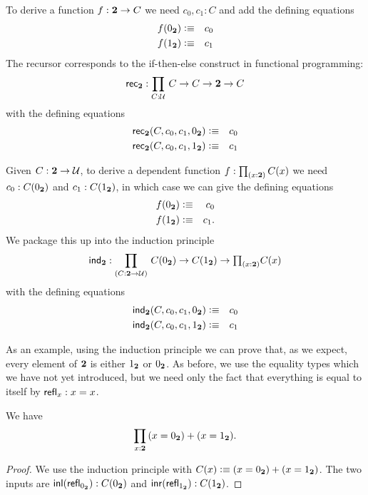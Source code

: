 To derive a function $f : \mathbf{2} \to C$ we need $c_0,c_1 : C$ and
add the defining equations
\begin{eqnarray*}
  f({0_{\mathbf{2}}}) & \vcentcolon\equiv & c_0 \\
  f({1_{\mathbf{2}}}) & \vcentcolon\equiv & c_1
\end{eqnarray*}
The recursor corresponds to the if-then-else construct in
functional programming:
%
\[ \rec{\bool} : \prd{C:\UU}  C \to C \to \bool \to C \]
with the defining equations
\begin{eqnarray*}
  \mathsf{rec}_{\mathbf{2}}(C,c_0,c_1,{0_{\mathbf{2}}}) & \vcentcolon\equiv & c_0 \\
  \mathsf{rec}_{\mathbf{2}}(C,c_0,c_1,{1_{\mathbf{2}}}) & \vcentcolon\equiv & c_1
\end{eqnarray*}

Given $C : \mathbf{2} \to \mathcal{U}$, to derive a dependent function 
$f : \prd{x:\bool}C(x)$ we need $c_0:C({0_{\mathbf{2}}})$ and $c_1 : C({1_{\mathbf{2}}})$, in which case we can give the defining equations
\begin{eqnarray*}
  f({0_{\mathbf{2}}}) & \vcentcolon\equiv & c_0 \\
  f({1_{\mathbf{2}}}) & \vcentcolon\equiv & c_1.
\end{eqnarray*}
We package this up into the induction principle
%
\[ \ind{\bool} : \dprd{C:\bool \to \UU}  C(\bfalse) \to C(\btrue)
\to \tprd{x:\bool} C(x) \]
with the defining equations
\begin{eqnarray*}
  \mathsf{ind}_{\mathbf{2}}(C,c_0,c_1,{0_{\mathbf{2}}}) & \vcentcolon\equiv & c_0 \\
  \mathsf{ind}_{\mathbf{2}}(C,c_0,c_1,{1_{\mathbf{2}}}) & \vcentcolon\equiv & c_1
\end{eqnarray*}

As an example, using the induction principle we can prove that, as we expect, every element of $\mathbf{2}$ is either ${1_{\mathbf{2}}}$ or ${0_{\mathbf{2}}}$.
As before, we use the equality types which we have not yet introduced, but we need only the fact that everything is equal to itself by $\mathsf{refl}_{x}:x=x$.

\begin{thm}\label{thm:allbool-trueorfalse}
  We have
  \[ \prd{x:\bool}(x=\bfalse)+(x=\btrue). \]
\end{thm}
\begin{proof}
  We use the induction principle with $C(x) \vcentcolon\equiv (x={0_{\mathbf{2}}})+(x={1_{\mathbf{2}}})$.
  The two inputs are ${\mathsf{inl}}(\mathsf{refl}_{{0_{\mathbf{2}}}}) : C({0_{\mathbf{2}}})$ and ${\mathsf{inr}}(\mathsf{refl}_{{1_{\mathbf{2}}}}):C({1_{\mathbf{2}}})$.
\end{proof}

